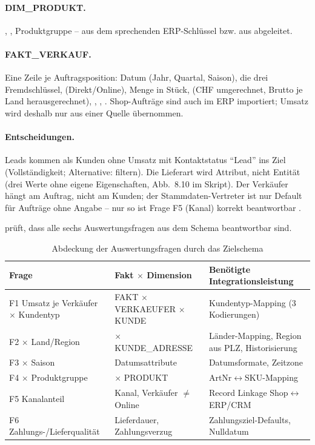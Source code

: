 \paragraph{DIM\_PRODUKT.} , , Produktgruppe -- aus dem sprechenden ERP-Schlüssel bzw. aus  abgeleitet.

\paragraph{FAKT\_VERKAUF.} Eine Zeile je Auftragsposition: Datum (Jahr, Quartal, Saison), die drei Fremdschlüssel,  (Direkt/Online), Menge in Stück,  (CHF umgerechnet, Brutto je Land herausgerechnet), , , . Shop-Aufträge sind auch im ERP importiert; Umsatz wird deshalb nur aus einer Quelle übernommen. 

\paragraph{Entscheidungen.} Leads kommen als Kunden ohne Umsatz mit Kontaktstatus \enquote{Lead} ins Ziel (Vollständigkeit; Alternative: filtern). Die Lieferart wird Attribut, nicht Entität (drei Werte ohne eigene Eigenschaften, Abb.~8.10 im Skript). Der Verkäufer hängt am Auftrag, nicht am Kunden; der Stammdaten-Vertreter ist nur Default für Aufträge ohne Angabe -- nur so ist Frage F5 (Kanal) korrekt beantwortbar .

 prüft, dass alle sechs Auswertungsfragen aus dem Schema beantwortbar sind.

\begin{table}[H]
  \centering\small
  \caption{Abdeckung der Auswertungsfragen durch das Zielschema}
  \label{tab:fragencheck}
  \begin{tabularx}{\textwidth}{@{}>{\raggedright\arraybackslash}p{4.2cm} >{\raggedright\arraybackslash}p{4.6cm} X@{}}
    \toprule
    Frage & Fakt $\times$ Dimension & Benötigte Integrationsleistung \\
    \midrule
    F1 Umsatz je Verkäufer $\times$ Kundentyp & FAKT $\times$ VERKAEUFER $\times$ KUNDE & Kundentyp-Mapping (3 Kodierungen) \\
    F2 $\times$ Land/Region & $\times$ KUNDE\_ADRESSE & Länder-Mapping, Region aus PLZ, Historisierung \\
    F3 $\times$ Saison & Datumsattribute & Datumsformate, Zeitzone \\
    F4 $\times$ Produktgruppe & $\times$ PRODUKT & ArtNr$\leftrightarrow$SKU-Mapping \\
    F5 Kanalanteil & Kanal, Verkäufer $\neq$ Online & Record Linkage Shop$\leftrightarrow$ERP/CRM \\
    F6 Zahlungs-/Lieferqualität & Lieferdauer, Zahlungsverzug & Zahlungsziel-Defaults, Nulldatum \\
    \bottomrule
  \end{tabularx}
\end{table}
